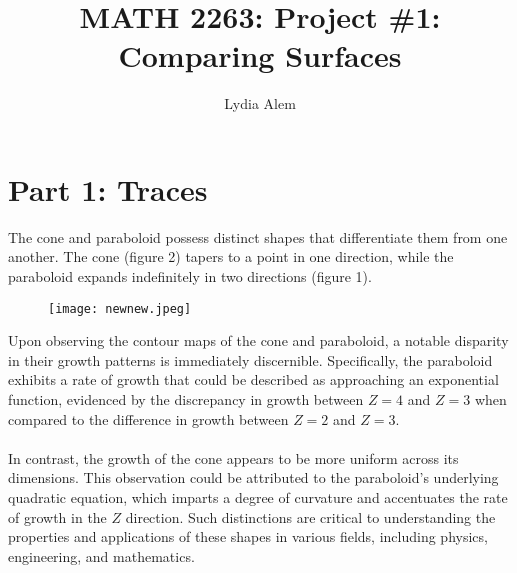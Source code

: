 \documentclass[english]{article}
\begin{document}
\title{MATH 2263: Project \#1: Comparing Surfaces}

\author{
Lydia Alem
}

\maketitle

\section{Part 1: Traces}\label{introduction}
    The cone and paraboloid possess distinct shapes that differentiate them from one another. The cone (figure 2) tapers to a point in one direction, while the paraboloid expands indefinitely in two directions (figure 1).
    
    \begin{figure}[H]
    	\begin{centering}
      		\texttt{[image: newnew.jpeg]}
    	\end{centering}
    \end{figure}

    
    

    Upon observing the contour maps of the cone and paraboloid, a notable disparity in their growth patterns is immediately discernible. Specifically, the paraboloid exhibits a rate of growth that could be described as approaching an exponential function, evidenced by the discrepancy in growth between $Z = 4$ and $Z = 3$ when compared to the difference in growth between $Z = 2$ and $Z = 3$. 
    \\
    \\
    In contrast, the growth of the cone appears to be more uniform across its dimensions.
    This observation could be attributed to the paraboloid's underlying quadratic equation, which imparts a degree of curvature and accentuates the rate of growth in the $Z$ direction. Such distinctions are critical to understanding the properties and applications of these shapes in various fields, including physics, engineering, and mathematics.
     
\end{document}
